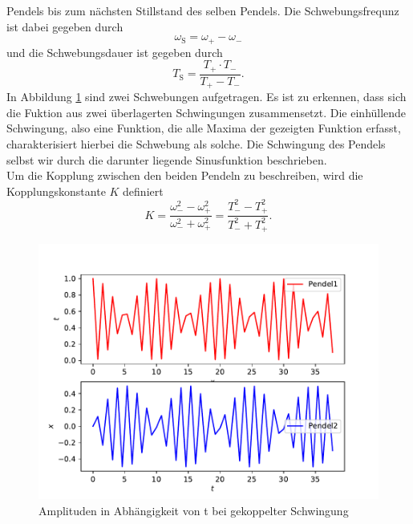 \begin{enumerate}
        Pendels bis zum nächsten Stillstand des selben Pendels. Die Schwebungsfrequnz ist dabei gegeben durch
        \begin{equation}
            \omega_\text{S}=\omega_+ - \omega_-
        \end{equation}
        und die Schwebungsdauer ist gegeben durch
        \begin{equation}
            T_\text{S}=\frac{T_+\cdot T_-}{T_+-T_-}.
        \end{equation}
        In Abbildung \ref{fig:gekoppelt} sind zwei Schwebungen aufgetragen. Es ist zu erkennen, dass sich die Fuktion aus zwei überlagerten Schwingungen zusammensetzt.
        Die einhüllende Schwingung, also eine Funktion, die alle Maxima der gezeigten Funktion erfasst, charakterisiert hierbei die Schwebung als solche. Die Schwingung
        des Pendels selbst wir durch die darunter liegende Sinusfunktion beschrieben.
        \\
        Um die Kopplung zwischen den beiden Pendeln zu beschreiben, wird die Kopplungskonstante $K$ definiert
        \begin{equation}
          \label{eqn:kopplungskonstante}
            K=\frac{\omega_-^2-\omega_+^2}{\omega_-^2+\omega_+^2}=\frac{T_-^2-T_+^2}{T_-^2+T_+^2}.
        \end{equation}
        \begin{figure}
            \centering
            \includegraphics[scale = 0.7]{gekoppelt.pdf}
            \caption{Amplituden in Abhängigkeit von t bei gekoppelter Schwingung}
            \label{fig:gekoppelt}
        \end{figure}
\end{enumerate}
